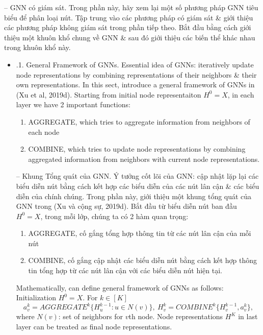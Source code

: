 \documentclass{article}
\begin{document}
\begin{itemize}
\begin{itemize}
        -- {\sf GNN có giám sát.} Trong phần này, hãy xem lại một số phương pháp GNN tiêu biểu để phân loại nút. Tập trung vào các phương pháp có giám sát \& giới thiệu các phương pháp không giám sát trong phần tiếp theo. Bắt đầu bằng cách giới thiệu một khuôn khổ chung về GNN \& sau đó giới thiệu các biến thể khác nhau trong khuôn khổ này.
        \begin{itemize}
            \item {.1. General Framework of GNNs.} Essential idea of GNNs: iteratively update node representations by combining representations of their neighbors \& their own representations. In this sect, introduce a general framework of GNNs in (Xu et al, 2019d). Starting from initial node representaiton $H^0 = X$, in each layer we have 2 important functions:
            \begin{enumerate}
                \item AGGREGATE, which tries to aggregate information from neighbors of each node
                \item COMBINE, which tries to update node representations by combining aggregated information from neighbors with current node representations.
            \end{enumerate}
            -- {\sf Khung Tổng quát của GNN.} Ý tưởng cốt lõi của GNN: cập nhật lặp lại các biểu diễn nút bằng cách kết hợp các biểu diễn của các nút lân cận \& các biểu diễn của chính chúng. Trong phần này, giới thiệu một khung tổng quát của GNN trong (Xu và cộng sự, 2019d). Bắt đầu từ biểu diễn nút ban đầu $H^0 = X$, trong mỗi lớp, chúng ta có 2 hàm quan trọng:
            \begin{enumerate}
                \item AGGREGATE, cố gắng tổng hợp thông tin từ các nút lân cận của mỗi nút
                \item COMBINE, cố gắng cập nhật các biểu diễn nút bằng cách kết hợp thông tin tổng hợp từ các nút lân cận với các biểu diễn nút hiện tại.
            \end{enumerate}
            Mathematically, can define general framework of GNNs as follows: Initialization $H^0 = X$. For $k\in[K]$
            \begin{equation*}
                a_v^k = AGGREGATE^k\{H_u^{k-1}:u\in N(v)\},\ H_v^k = COMBINE^k\{H_v^{k-1},a_v^k\},
            \end{equation*}
            where $N(v)$: set of neighbors for $v$th node. Node representations $H^K$ in last layer can be treated as final node representations.


\end{itemize}
\end{itemize}
\end{itemize}
\end{document}
